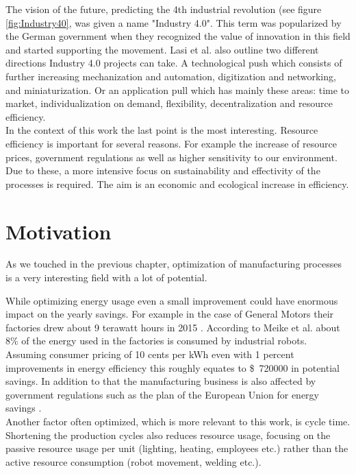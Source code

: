 The vision of the future, predicting the 4th industrial revolution (see figure \ref{fig:Industry40}, was given a name "Industry 4.0". This term was popularized by the German government when they recognized the value of innovation in this field and started supporting the movement. Lasi et al. \cite{Industry40} also outline two different directions Industry 4.0 projects can take. A technological push which consists of further increasing mechanization and automation, digitization and networking, and miniaturization. Or an application pull which has mainly these areas: time to market, individualization on demand, flexibility, decentralization and resource efficiency. \\

In the context of this work the last point is the most interesting.
Resource efficiency is important for several reasons.
For example the increase of resource prices, government regulations as well as higher sensitivity to our environment. Due to these, a more intensive focus on sustainability and effectivity of the processes is required. 
The aim is an economic and ecological increase in efficiency. 

\section{Motivation}

As we touched in the previous chapter, optimization of manufacturing processes is a very interesting field with a lot of potential.

While optimizing energy usage even a small improvement could have enormous impact on the yearly savings. For example in the case of General Motors their factories drew about 9 terawatt hours in 2015 \cite{GMEnergySpending}. According to Meike et al. \cite{Meike8Percent} about 8\% of the energy used in the factories is consumed by industrial robots. Assuming consumer pricing of 10 cents per kWh even with 1 percent improvements in energy efficiency this roughly equates to \$~720000 in potential savings. In addition to that the manufacturing business is also affected by government regulations such as the plan of the European Union for energy savings \cite{EUElectricity}. \\

Another factor often optimized, which is more relevant to this work, is cycle time. Shortening the production cycles also reduces resource usage, focusing on the passive resource usage per unit (lighting, heating, employees etc.) rather than the active resource consumption (robot movement, welding etc.). \\

